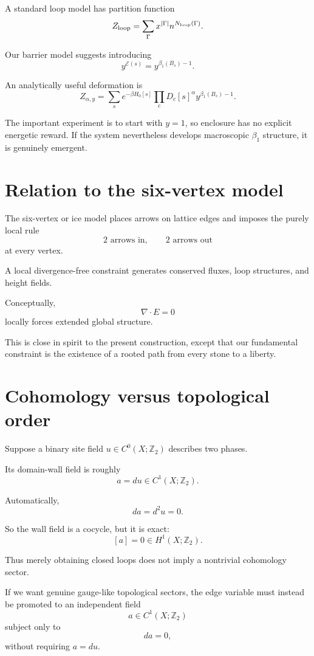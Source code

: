 \documentclass[11pt]{article}
\begin{document}
A standard loop model has partition function
\[
Z_{\rm loop}
=
\sum_{\Gamma}
x^{|\Gamma|}
n^{N_{\rm loop}(\Gamma)}.
\]

Our barrier model suggests introducing
\[
y^{\mathcal E(s)}
=
y^{\beta_1(B_s)-1}.
\]

An analytically useful deformation is
\[
Z_{\alpha,y}
=
\sum_s
e^{-\beta H_0[s]}
\prod_cD_c[s]^\alpha
y^{\beta_1(B_s)-1}.
\]

The important experiment is to start with \(y=1\), so enclosure has no explicit energetic reward. If the system nevertheless develops macroscopic \(\beta_1\) structure, it is genuinely emergent.

\section{Relation to the six-vertex model}

The six-vertex or ice model places arrows on lattice edges and imposes the purely local rule
\[
2\text{ arrows in},
\qquad
2\text{ arrows out}
\]
at every vertex.

A local divergence-free constraint generates conserved fluxes, loop structures, and height fields.

Conceptually,
\[
\nabla\cdot E=0
\]
locally forces extended global structure.

This is close in spirit to the present construction, except that our fundamental constraint is the existence of a rooted path from every stone to a liberty.

\section{Cohomology versus topological order}

Suppose a binary site field \(u\in C^0(X;\mathbb Z_2)\) describes two phases.

Its domain-wall field is roughly
\[
a=du\in C^1(X;\mathbb Z_2).
\]

Automatically,
\[
da=d^2u=0.
\]

So the wall field is a cocycle, but it is exact:
\[
[a]=0\in H^1(X;\mathbb Z_2).
\]

Thus merely obtaining closed loops does not imply a nontrivial cohomology sector.

If we want genuine gauge-like topological sectors, the edge variable must instead be promoted to an independent field
\[
a\in C^1(X;\mathbb Z_2)
\]
subject only to
\[
da=0,
\]
without requiring \(a=du\).
\end{document}
